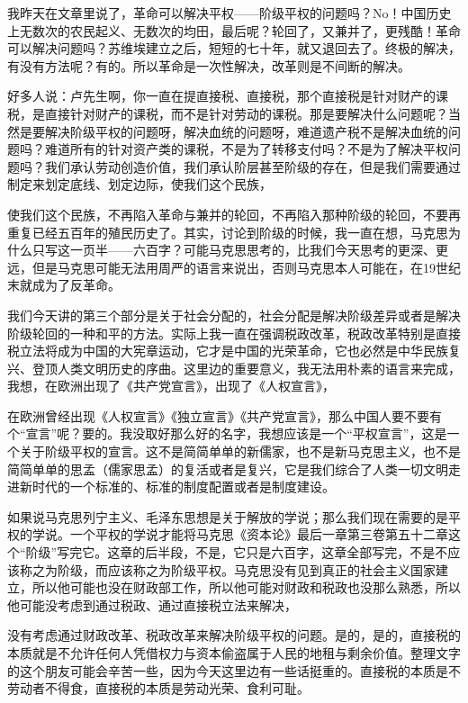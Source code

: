 \documentclass[UTF8, 12pt, a4paper]{ctexrep}
\begin{document}
我昨天在文章里说了，革命可以解决平权——阶级平权的问题吗？No！中国历史上无数次的农民起义、无数次的均田，最后呢？轮回了，又兼并了，更残酷！革命可以解决问题吗？苏维埃建立之后，短短的七十年，就又退回去了。终极的解决，有没有方法呢？有的。所以革命是一次性解决，改革则是不间断的解决。

好多人说：卢先生啊，你一直在提直接税、直接税，那个直接税是针对财产的课税，是直接针对财产的课税，而不是针对劳动的课税。那是要解决什么问题呢？当然是要解决阶级平权的问题呀，解决血统的问题呀，难道遗产税不是解决血统的问题吗？难道所有的针对资产类的课税，不是为了转移支付吗？不是为了解决平权问题吗？我们承认劳动创造价值，我们承认阶层甚至阶级的存在，但是我们需要通过制定来划定底线、划定边际，使我们这个民族，

使我们这个民族，不再陷入革命与兼并的轮回，不再陷入那种阶级的轮回，不要再重复已经五百年的殖民历史了。其实，讨论到阶级的时候，我一直在想，马克思为什么只写这一页半——六百字？可能马克思思考的，比我们今天思考的更深、更远，但是马克思可能无法用周严的语言来说出，否则马克思本人可能在，在19世纪末就成为了反革命。

我们今天讲的第三个部分是关于社会分配的，社会分配是解决阶级差异或者是解决阶级轮回的一种和平的方法。实际上我一直在强调税政改革，税政改革特别是直接税立法将成为中国的大宪章运动，它才是中国的光荣革命，它也必然是中华民族复兴、登顶人类文明历史的序曲。这里边的重要意义，我无法用朴素的语言来完成，我想，在欧洲出现了《共产党宣言》，出现了《人权宣言》，

在欧洲曾经出现《人权宣言》《独立宣言》《共产党宣言》，那么中国人要不要有个“宣言”呢？要的。我没取好那么好的名字，我想应该是一个“平权宣言”，这是一个关于阶级平权的宣言。这不是简简单单的新儒家，也不是新马克思主义，也不是简简单单的思孟（儒家思孟）的复活或者是复兴，它是我们综合了人类一切文明走进新时代的一个标准的、标准的制度配置或者是制度建设。

如果说马克思列宁主义、毛泽东思想是关于解放的学说；那么我们现在需要的是平权的学说。一个平权的学说才能将马克思《资本论》最后一章第三卷第五十二章这个“阶级”写完它。这章的后半段，不是，它只是六百字，这章全部写完，不是不应该称之为阶级，而应该称之为阶级平权。马克思没有见到真正的社会主义国家建立，所以他可能也没在财政部工作，所以他可能对财政和税政也没那么熟悉，所以他可能没考虑到通过税政、通过直接税立法来解决，

没有考虑通过财政改革、税政改革来解决阶级平权的问题。是的，是的，直接税的本质就是不允许任何人凭借权力与资本偷盗属于人民的地租与剩余价值。整理文字的这个朋友可能会辛苦一些，因为今天这里边有一些话挺重的。直接税的本质是不劳动者不得食，直接税的本质是劳动光荣、食利可耻。
\end{document}
